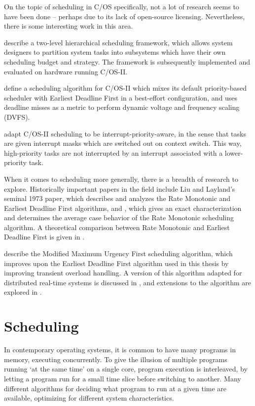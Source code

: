 \documentclass[twoside]{uva-inf-bachelor-thesis}
\newcommand{\ucosii}{\textmu C/OS-II\xspace}
\newcommand{\ucos}{\textmu C/OS\xspace}
\begin{document}
On the topic of scheduling in \ucos specifically, not a lot of research seems to have been done -- perhaps due to its lack of open-source licensing. Nevertheless, there is some interesting work in this area.

\textcite{tue:hfs} describe a two-level hierarchical scheduling framework, which allows system designers to partition system tasks into subsystems which have their own scheduling budget and strategy. The framework is subsequently implemented and evaluated on hardware running \ucosii.

\textcite{Cho2011} define a scheduling algorithm for \ucosii which mixes its default priority-based scheduler with Earliest Deadline First in a best-effort configuration, and uses deadline misses as a metric to perform dynamic voltage and frequency scaling (DVFS).

\textcite{dodiu2010} adapt \ucosii scheduling to be interrupt-priority-aware, in the sense that tasks are given interrupt masks which are switched out on context switch. This way, high-priority tasks are not interrupted by an interrupt associated with a lower-priority task.

When it comes to scheduling more generally, there is a breadth of research to explore.
Historically important papers in the field include Liu and Layland's seminal 1973 paper\cite{Liu1973}, which describes and analyzes the Rate Monotonic and Earliest Deadline First algorithms, and \textcite{Lehoczky1989}, which gives an exact characterization and determines the average case behavior of the Rate Monotonic scheduling algorithm. A theoretical comparison between Rate Monotonic and Earliest Deadline First is given in \textcite{Buttazzo2005}.

\textcite{salmani2005modified} describe the Modified Maximum Urgency First scheduling algorithm, which improves upon the Earliest Deadline First algorithm used in this thesis by improving transient overload handling. A version of this algorithm adapted for distributed real-time systems is discussed in \textcite{chen2006flexible}, and extensions to the algorithm are explored in \textcite{behera2012enhanced}.

%
%
%
%

\chapter{Scheduling}
In contemporary operating systems, it is common to have many programs in memory, executing concurrently. To give the illusion of multiple programs running `at the same time' on a single core, program execution is interleaved, by letting a program run for a small time slice before switching to another. Many different algorithms for deciding what program to run at a given time are available, optimizing for different system characteristics.
\end{document}
